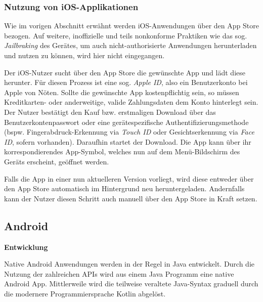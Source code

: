 \subsubsection{Nutzung von iOS-Applikationen}
Wie im vorigen Abschnitt erwähnt werden iOS-Anwendungen über den App Store bezogen. Auf weitere, inoffizielle und teils nonkonforme Praktiken wie das sog. \textit{Jailbraking} des Gerätes, um auch nicht-authorisierte Anwendungen herunterladen und nutzen zu können, wird hier nicht eingegangen.

Der iOS-Nutzer sucht über den App Store die gewünschte App und lädt diese herunter. Für diesen Prozess ist eine sog. \textit{Apple ID}, also ein Benutzerkonto bei Apple von Nöten. Sollte die gewünschte App kostenpflichtig sein, so müssen Kreditkarten- oder anderweitige, valide Zahlungsdaten dem Konto hinterlegt sein. Der Nutzer bestätigt den Kauf bzw. erstmaligen Download über das Benutzerkontenpasswort oder eine gerätespezifische Authentifizierungsmethode (bspw. Fingerabdruck-Erkennung via \textit{Touch ID} oder Gesichtserkennung via \textit{Face ID}, sofern vorhanden). Daraufhin startet der Download. Die App kann über ihr korrespondierendes App-Symbol, welches nun auf dem Menü-Bildschirm des Geräts erscheint, geöffnet werden.

Falls die App in einer nun aktuelleren Version vorliegt, wird diese entweder über den App Store automatisch im Hintergrund neu heruntergeladen. Andernfalls kann der Nutzer diesen Schritt auch manuell über den App Store in Kraft setzen.



\subsection{Android}

\textbf{Entwicklung}


Native Android Anwendungen werden in der Regel in Java entwickelt. Durch die Nutzung der zahlreichen APIs wird aus einem Java Programm eine native Android App.
\cite[S. 1]{JavaForAndroid}
Mittlerweile wird die teilweise veraltete Java-Syntax graduell durch die modernere Programmiersprache Kotlin abgelöst.
\cite{KotlinAndroid}


